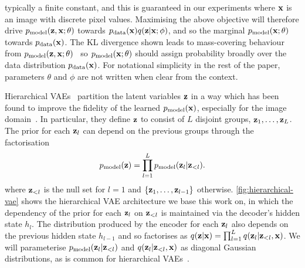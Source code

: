 typically a finite constant, and this is guaranteed in our experiments where
$\mathbf{x}{}$ is an image with discrete pixel values. Maximising the above objective
will therefore drive $p_{\rm{model}}{}(\mathbf{z}{}, \mathbf{x}{}; \theta)$ towards
$p_{\rm{data}}{}(\mathbf{x}{})q(\mathbf{z}{}|\mathbf{x}{}; \phi)$, and so the marginal $p_{\rm{model}}{}(\mathbf{x}{}; \theta)$
towards $p_{\rm{data}}{}(\mathbf{x}{})$. The KL divergence shown leads to mass-covering
behaviour from $p_{\rm{model}}{}(\mathbf{z}{}, \mathbf{x}{}; \theta)$~\citep{bishop2006pattern} so
$p_{\rm{model}}{}(\mathbf{x}{}; \theta)$ should assign probability broadly over the data
distribution $p_{\rm{data}}{}(\mathbf{x}{})$.
For notational simplicity in the rest of the paper, parameters $\theta$ and
$\phi$ are not written when clear from the context.

Hierarchical
VAEs~\citep{gregor2015draw,kingma2016improving,sonderby2016ladder,klushyn2019learning}
partition the latent variables $\mathbf{z}{}$ in a way which has been found to improve the
fidelity of the learned $p_{\rm{model}}{}(\mathbf{x}{})$, especially for the image
domain~\citep{vahdat2020nvae,child2020very}. In particular, they define $\mathbf{z}{}$ to
consist of $L$ disjoint groups, $\mathbf{z}{}_1,\ldots,\mathbf{z}{}_L$. The prior for each $\mathbf{z}{}_l$ can
depend on the previous groups through the factorisation
\begin{equation}
  \label{eq:hierarchical-prior}
  p_{\rm{model}}{}(\mathbf{z}{}) = \prod_{l=1}^L p_{\rm{model}}{}(\mathbf{z}{}_l|\mathbf{z}{}_{<l}).
\end{equation}
where $\mathbf{z}{}_{<l}$ is the null set for $l=1$ and $\{\mathbf{z}{}_1,\ldots,\mathbf{z}{}_{l-1}\}$
otherwise. \cref{fig:hierarchical-vae} shows the hierarchical VAE architecture
we base this work on, in which the dependency of the prior for each $\mathbf{z}{}_l$ on
$\mathbf{z}{}_{<l}$ is maintained via the decoder's hidden state $h_l$. The distribution
produced by the encoder for each $\mathbf{z}{}_l$ also depends on the previous hidden
state $h_{l-1}$ and so factorises as
$q(\mathbf{z}{}|\mathbf{x}{}) = \prod_{l=1}^L q(\mathbf{z}{}_l|\mathbf{z}{}_{<l}, \mathbf{x}{})$. We will parameterise
$p_{\rm{model}}{}(\mathbf{z}{}_l|\mathbf{z}{}_{<l})$ and $q(\mathbf{z}{}_l|\mathbf{z}{}_{<l}, \mathbf{x}{})$ as diagonal
Gaussian distributions, as is common for hierarchical
VAEs~\citep{sonderby2016ladder,vahdat2020nvae,child2020very}.

